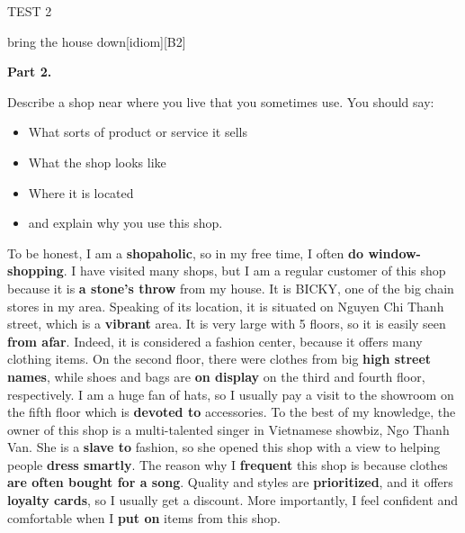\begin{glossarymc}[Cambridge 10]
\begin{test}{TEST 2}
\begin{VocabExplain}[Part 1]
            \begin{ExplainCard}{bring the house down}[idiom][B2]
            \end{ExplainCard}
        \end{VocabExplain}

    \noindent
    \textbf{Part 2.}
    \begin{qa}{Describe a shop near where you live that you sometimes use. You should say:}
    \begin{itemize}
    \item What sorts of product or service it sells
    \item What the shop looks like
    \item Where it is located
    \item and explain why you use this shop.
    \end{itemize}

    To be honest, I am a \textbf{shopaholic}, so in my free time, I often \textbf{do window-shopping}. I have visited many shops, but I am a regular customer of this shop because it is \textbf{a stone's throw} from my house. It is BICKY, one of the big chain stores in my area. Speaking of its location, it is situated on Nguyen Chi Thanh street, which is a \textbf{vibrant} area. It is very large with 5 floors, so it is easily seen \textbf{from afar}. Indeed, it is considered a fashion center, because it offers many clothing items. On the second floor, there were clothes from big \textbf{high street names}, while shoes and bags are \textbf{on display} on the third and fourth floor, respectively. I am a huge fan of hats, so I usually pay a visit to the showroom on the fifth floor which is \textbf{devoted to} accessories. To the best of my knowledge, the owner of this shop is a multi-talented singer in Vietnamese showbiz, Ngo Thanh Van. She is a \textbf{slave to} fashion, so she opened this shop with a view to helping people \textbf{dress smartly}. The reason why I \textbf{frequent} this shop is because clothes \textbf{are often bought for a song}. Quality and styles are \textbf{prioritized}, and it offers \textbf{loyalty cards}, so I usually get a discount. More importantly, I feel confident and comfortable when I \textbf{put on} items from this shop.
    \end{qa}


\end{test}
\end{glossarymc}
